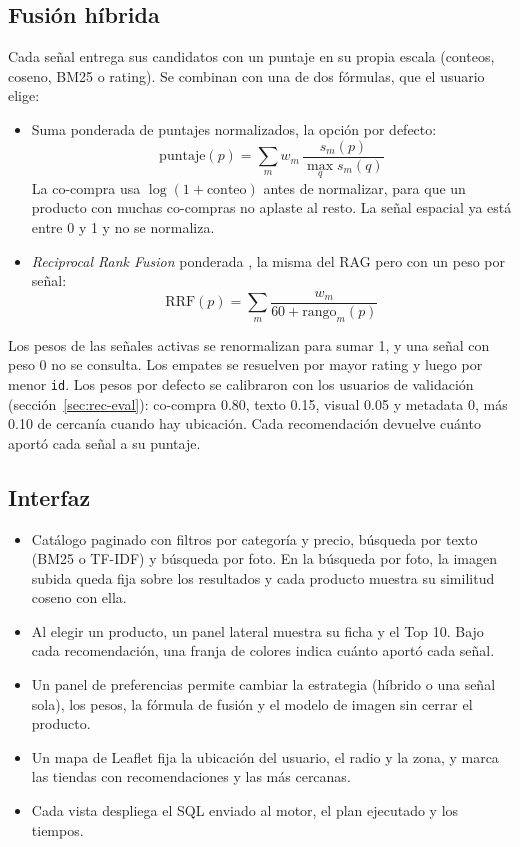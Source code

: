 \subsection{Fusión híbrida}
Cada señal entrega sus candidatos con un puntaje en su propia escala (conteos, coseno, BM25 o rating). Se combinan con una de dos fórmulas, que el usuario elige:
\begin{itemize}
  \item Suma ponderada de puntajes normalizados, la opción por defecto:
  \[
  \text{puntaje}(p) = \sum_{m} w_m \, \frac{s_m(p)}{\max_q s_m(q)}
  \]
  La co-compra usa $\log(1 + \text{conteo})$ antes de normalizar, para que un producto con muchas co-compras no aplaste al resto. La señal espacial ya está entre 0 y 1 y no se normaliza.
  \item \emph{Reciprocal Rank Fusion} ponderada \citep{rrf}, la misma del RAG pero con un peso por señal:
  \[
  \text{RRF}(p) = \sum_{m} \frac{w_m}{60 + \text{rango}_m(p)}
  \]
\end{itemize}
Los pesos de las señales activas se renormalizan para sumar 1, y una señal con peso 0 no se consulta. Los empates se resuelven por mayor rating y luego por menor \texttt{id}. Los pesos por defecto se calibraron con los usuarios de validación (sección~\ref{sec:rec-eval}): co-compra 0.80, texto 0.15, visual 0.05 y metadata 0, más 0.10 de cercanía cuando hay ubicación. Cada recomendación devuelve cuánto aportó cada señal a su puntaje.

\subsection{Interfaz}
\begin{itemize}
  \item Catálogo paginado con filtros por categoría y precio, búsqueda por texto (BM25 o TF-IDF) y búsqueda por foto. En la búsqueda por foto, la imagen subida queda fija sobre los resultados y cada producto muestra su similitud coseno con ella.
  \item Al elegir un producto, un panel lateral muestra su ficha y el Top 10. Bajo cada recomendación, una franja de colores indica cuánto aportó cada señal.
  \item Un panel de preferencias permite cambiar la estrategia (híbrido o una señal sola), los pesos, la fórmula de fusión y el modelo de imagen sin cerrar el producto.
  \item Un mapa de Leaflet fija la ubicación del usuario, el radio y la zona, y marca las tiendas con recomendaciones y las más cercanas.
  \item Cada vista despliega el SQL enviado al motor, el plan ejecutado y los tiempos.
\end{itemize}

